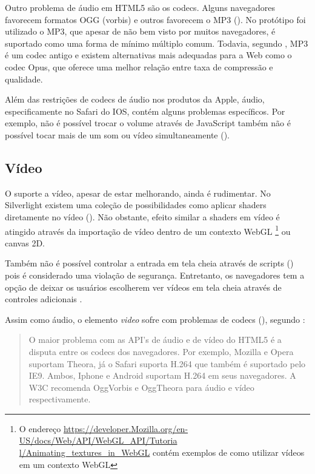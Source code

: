 Outro problema de áudio em HTML5 são os codecs. Alguns
navegadores favorecem formatos OGG (vorbis) e outros favorecem o
MP3 ().
No protótipo foi utilizado o MP3, que apesar de não bem visto por
muitos navegadores, é suportado como uma forma de mínimo múltiplo
comum. Todavia, segundo \citet{opus}, MP3 é um codec antigo e existem
alternativas mais adequadas para a Web como o codec Opus, que oferece
uma melhor relação entre taxa de compressão e qualidade.

Além das restrições de codecs de áudio nos produtos da Apple,
áudio, especificamente no Safari do IOS, contém alguns problemas
específicos. Por exemplo, não é possível trocar o volume
através de JavaScript também não é possível tocar mais de um
som ou vídeo simultaneamente \autocite{unsolvedMediaHtmlIssues}
().

\subsection{Vídeo}

O suporte a vídeo, apesar de estar melhorando, ainda é rudimentar.
No Silverlight existem uma coleção de possibilidades como aplicar
shaders diretamente no vídeo \autocite[p. 8]{researchOnHtml}
(). Não obstante, efeito similar
a shaders em vídeo é atingido através da importação de
vídeo dentro de um contexto WebGL \footnote{O endereço
\url{https://developer.Mozilla.org/en-US/docs/Web/API/WebGL_API/Tutoria
l/Animating_textures_in_WebGL} contém exemplos de como utilizar vídeos
em um contexto WebGL} ou canvas 2D.

Também não é possível controlar a entrada em tela cheia através de
scripts () pois é considerado uma
violação de segurança. Entretanto, os navegadores tem a opção de
deixar os usuários escolherem ver vídeos em tela cheia através de
controles adicionais \autocite[p. 68]{proHtml5}.

Assim como áudio, o elemento \textit{video} sofre com problemas de
codecs (), segundo \citet{html5Tradeoffs}:
\begin{quote}
O maior problema com as API's de áudio e de vídeo do HTML5 é
a disputa entre os codecs dos navegadores. Por exemplo, Mozilla e
Opera suportam Theora, já o Safari suporta H.264 que também é
suportado pelo IE9. Ambos, Iphone e Android suportam H.264 em seus
navegadores. A W3C recomenda OggVorbis e OggTheora para áudio e vídeo
respectivamente.
\end{quote}

